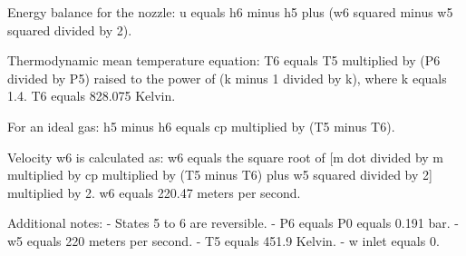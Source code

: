 Energy balance for the nozzle:  
u equals h6 minus h5 plus (w6 squared minus w5 squared divided by 2).  

Thermodynamic mean temperature equation:  
T6 equals T5 multiplied by (P6 divided by P5) raised to the power of (k minus 1 divided by k), where k equals 1.4.  
T6 equals 828.075 Kelvin.  

For an ideal gas:  
h5 minus h6 equals cp multiplied by (T5 minus T6).  

Velocity w6 is calculated as:  
w6 equals the square root of [m dot divided by m multiplied by cp multiplied by (T5 minus T6) plus w5 squared divided by 2] multiplied by 2.  
w6 equals 220.47 meters per second.  

Additional notes:  
- States 5 to 6 are reversible.  
- P6 equals P0 equals 0.191 bar.  
- w5 equals 220 meters per second.  
- T5 equals 451.9 Kelvin.  
- w inlet equals 0.